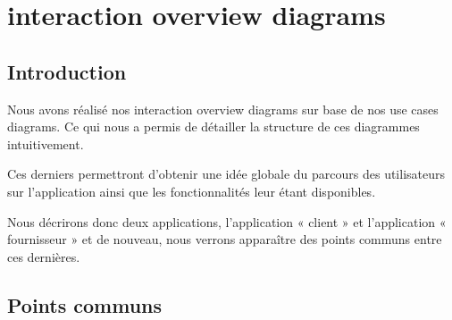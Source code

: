 \section{interaction overview diagrams}

\subsection{Introduction}

Nous avons réalisé nos interaction overview diagrams sur base de nos use cases diagrams. 
Ce qui nous a permis de détailler la structure de ces diagrammes intuitivement.
\newline

\begin{flushleft}
Ces derniers permettront d’obtenir une idée globale du parcours des utilisateurs sur l’application ainsi que les fonctionnalités leur étant disponibles.
\end{flushleft}
\newline
\newline

\begin{flushleft}
Nous décrirons donc deux applications, l’application « client » et l’application « fournisseur » et de nouveau, nous verrons apparaître des points communs entre ces dernières.
\end{flushleft}

\newpage
\subsection{Points communs}

